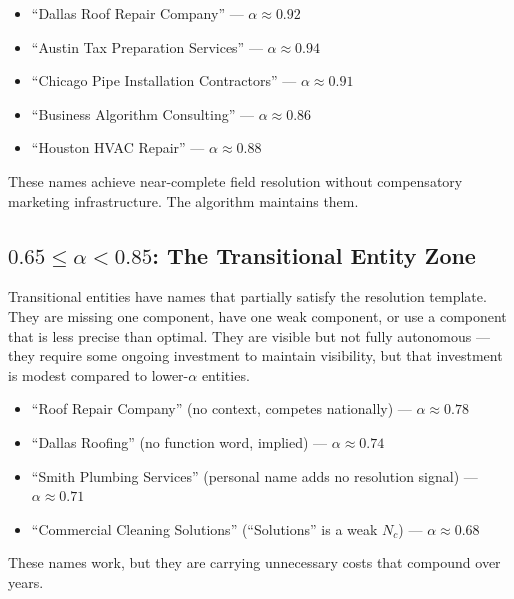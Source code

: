 \documentclass[12pt, openany]{book}
\theoremstyle{thmstyle}
\theoremstyle{defstyle}
\newcommand{\Nc}{N_c}
\begin{document}
\begin{examplebox}
\begin{itemize}[leftmargin=1.5em]
  \item ``Dallas Roof Repair Company'' --- $\alpha \approx 0.92$
  \item ``Austin Tax Preparation Services'' --- $\alpha \approx 0.94$
  \item ``Chicago Pipe Installation Contractors'' --- $\alpha \approx 0.91$
  \item ``Business Algorithm Consulting'' --- $\alpha \approx 0.86$
  \item ``Houston HVAC Repair'' --- $\alpha \approx 0.88$
\end{itemize}
These names achieve near-complete field resolution without compensatory marketing infrastructure. The algorithm maintains them.
\end{examplebox}

\subsection{$0.65 \leq \alpha < 0.85$: The Transitional Entity Zone}

Transitional entities have names that partially satisfy the resolution template. They are missing one component, have one weak component, or use a component that is less precise than optimal. They are visible but not fully autonomous --- they require some ongoing investment to maintain visibility, but that investment is modest compared to lower-$\alpha$ entities.

\begin{examplebox}
\begin{itemize}[leftmargin=1.5em]
  \item ``Roof Repair Company'' (no context, competes nationally) --- $\alpha \approx 0.78$
  \item ``Dallas Roofing'' (no function word, implied) --- $\alpha \approx 0.74$
  \item ``Smith Plumbing Services'' (personal name adds no resolution signal) --- $\alpha \approx 0.71$
  \item ``Commercial Cleaning Solutions'' (``Solutions'' is a weak $\Nc$) --- $\alpha \approx 0.68$
\end{itemize}
These names work, but they are carrying unnecessary costs that compound over years.
\end{examplebox}
\end{document}
